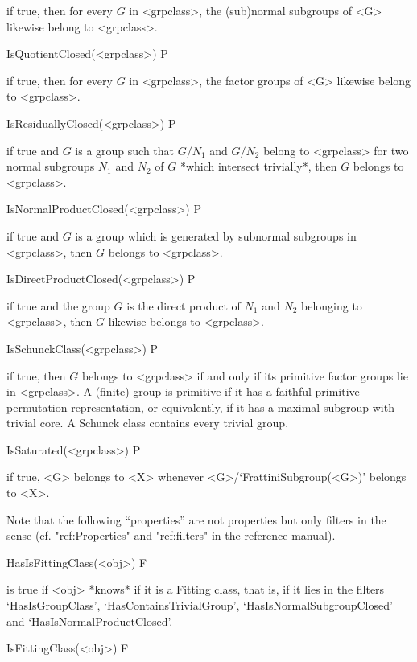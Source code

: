 if true, then for every $G$ in <grpclass>, the (sub)normal subgroups of <G>
likewise belong to <grpclass>.

\> IsQuotientClosed(<grpclass>) P

if true, then for every $G$ in <grpclass>, the factor groups of <G>
likewise belong to <grpclass>.

\> IsResiduallyClosed(<grpclass>) P

if true and $G$ is a group such that $G/N_1$ and $G/N_2$ belong to
<grpclass> for two normal subgroups $N_1$ and $N_2$ of $G$ *which intersect
trivially*, then $G$ belongs to <grpclass>.

\> IsNormalProductClosed(<grpclass>) P

if true and $G$ is a group which is generated by subnormal subgroups in <grpclass>,
then $G$ belongs to <grpclass>.

\> IsDirectProductClosed(<grpclass>) P

if true and the group $G$ is the direct product of $N_1$ and
$N_2$ belonging to <grpclass>, then $G$ likewise belongs to
<grpclass>.

\> IsSchunckClass(<grpclass>) P

if true, then $G$ belongs to <grpclass> if and only if its primitive
factor groups lie in <grpclass>. A (finite) group is primitive if it has a
faithful primitive permutation representation, or equivalently, if it has a
maximal subgroup with trivial core. A Schunck class contains every trivial
group. 

\>IsSaturated(<grpclass>) P

if true, <G> belongs to <X> whenever <G>/`FrattiniSubgroup(<G>)' belongs to
<X>.


\null


Note that the following ``properties'' are not properties but only filters in
the {\GAP} sense (cf. "ref:Properties" and "ref:filters" in the {\GAP}
reference manual).

\>HasIsFittingClass(<obj>) F

is true if <obj> *knows* if it is a Fitting class, that is, if it lies in the
filters  `HasIsGroupClass', `HasContainsTrivialGroup',
`HasIsNormalSubgroupClosed'  and `HasIsNormalProductClosed'.

\>IsFittingClass(<obj>) F

